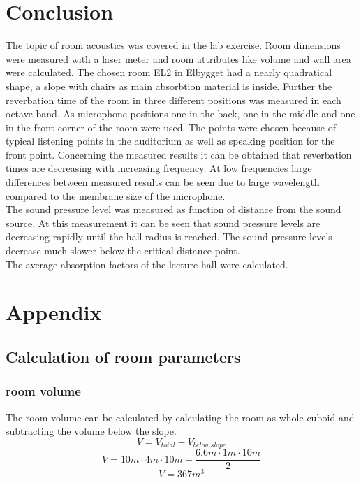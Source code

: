 \documentclass{article}
\begin{document}
\section{Conclusion}
The topic of room acoustics was covered in the lab exercise. Room dimensions were measured with a laser meter and room attributes like volume and wall area were calculated. The chosen room EL2 in Elbygget had a nearly quadratical shape, a slope with chairs as main absorbtion material is inside. Further the reverbation time of the room in three different positions was measured in each octave band. As microphone positions one in the back, one in the middle and one in the front corner of the room were used. The points were chosen because of typical listening points in the auditorium as well as speaking position for the front point. Concerning the measured results it can be obtained that reverbation times are decreasing with increasing frequency. At low frequencies large differences between measured results can be seen due to large wavelength compared to the membrane size of the microphone.\\
The sound pressure level was measured as function of distance from the sound source. At this measurement it can be seen that sound pressure levels are decreasing rapidly until the hall radius is reached. The sound pressure levels decrease much slower below the critical distance point.\\
The average absorption factors of the lecture hall were calculated. 
\newpage
\section{Appendix}
\subsection{Calculation of room parameters\label{sec:roomparam}}
\subsubsection{room volume}
The room volume can be calculated by calculating the room as whole cuboid and subtracting the volume below the slope.
\begin{equation}
V=V_{total}-V_{below\,slope}
\end{equation}
$$V=10m\cdot 4m\cdot 10m-\frac{6.6m\cdot 1m\cdot 10m}{2}$$
$$V=367m^3$$
\end{document}
